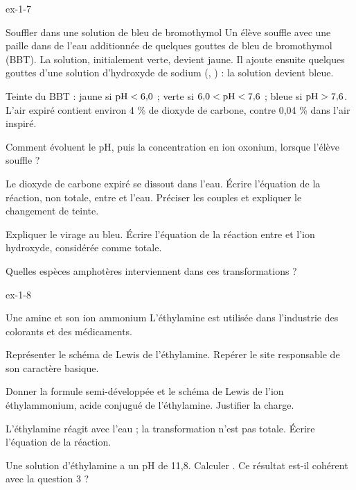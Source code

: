 \begin{blocLivre}{ex-1-7}
\begin{exercice}[2]{Souffler dans une solution de bleu de bromothymol}
Un élève souffle avec une paille dans de l'eau additionnée de quelques gouttes de bleu de
bromothymol (BBT). La solution, initialement verte, devient jaune. Il ajoute ensuite quelques
gouttes d'une solution d'hydroxyde de sodium (, ) : la solution devient bleue.
\begin{donnees}
Teinte du BBT : jaune si $\mathrm{pH}<6{,}0$ ; verte si $6{,}0<\mathrm{pH}<7{,}6$ ; bleue si $\mathrm{pH}>7{,}6$.
L'air expiré contient environ 4 \% de dioxyde de carbone, contre 0,04 \% dans l'air inspiré.
\end{donnees}
\begin{questions}
\item Comment évoluent le pH, puis la concentration en ion oxonium, lorsque l'élève souffle ?
\item Le dioxyde de carbone expiré se dissout dans l'eau. Écrire l'équation de la réaction,
non totale, entre  et l'eau. Préciser les couples et expliquer le changement de teinte.
\item Expliquer le virage au bleu. Écrire l'équation de la réaction entre  et
l'ion hydroxyde, considérée comme totale.
\item Quelles espèces amphotères interviennent dans ces transformations ?
\end{questions}
\end{exercice}
\end{blocLivre}
\begin{blocLivre}{ex-1-8}
\begin{exercice}[2]{Une amine et son ion ammonium}
L'éthylamine  est utilisée dans l'industrie des colorants et des médicaments.
\begin{questions}
\item Représenter le schéma de Lewis de l'éthylamine. Repérer le site responsable de son caractère basique.
\item Donner la formule semi-développée et le schéma de Lewis de l'ion éthylammonium, acide conjugué
de l'éthylamine. Justifier la charge.
\item L'éthylamine réagit avec l'eau ; la transformation n'est pas totale. Écrire l'équation de la réaction.
\item Une solution d'éthylamine a un pH de 11,8. Calculer \hho. Ce résultat est-il cohérent avec la question 3 ?
\end{questions}
\end{exercice}
\end{blocLivre}
